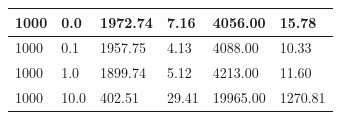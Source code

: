 \documentclass[12pt,a4paper]{report}
\begin{document}
\begin{table}[H]
\begin{tabular}{|l|l|l|l|l|l|}
1000                                                                                            & 0.0                                                                                                                    & 1972.74                                                                                                                                    & 7.16                                                                                                                              & 4056.00                                                                                               & 15.78                                                                                                                                   \\ \hline
1000                                                                                            & 0.1                                                                                                                    & 1957.75                                                                                                                                    & 4.13                                                                                                                              & 4088.00                                                                                               & 10.33                                                                                                                                   \\ \hline
1000                                                                                            & 1.0                                                                                                                    & 1899.74                                                                                                                                    & 5.12                                                                                                                              & 4213.00                                                                                               & 11.60                                                                                                                                   \\ \hline
1000                                                                                            & 10.0                                                                                                                   & 402.51                                                                                                                                     & 29.41                                                                                                                             & 19965.00                                                                                              & 1270.81                                                                                                                                 \\ \hline

\end{tabular}
\end{table}
\end{document}
